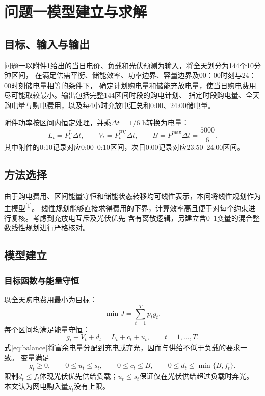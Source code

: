 \documentclass[UTF8,a4paper,12pt]{ctexart}
\begin{document}
\section{问题一模型建立与求解}

\subsection{目标、输入与输出}
问题一以附件1给出的当日电价、负载和光伏预测为输入，将全天划分为144个10分钟区间，
在满足供需平衡、储能效率、功率边界、容量边界及00：00时刻与24：00时刻储电量相等的条件下，
确定计划购电量和储能充放电量，使当日购电费用尽可能取较最小。输出包括完整144区间时段的购电计划、
指定时段购电量、全天购电量与购电费用，以及每4小时充放电汇总和0:00、24:00储电量。

附件功率按区间内恒定处理，并乘$\Delta t=1/6$ h转换为电量：
\begin{equation}
  L_t=P_t^{\mathrm L}\Delta t,\qquad
  V_t=P_t^{\mathrm{PV}}\Delta t,\qquad
  B=P^{\max}\Delta t=\frac{5000}{6}.
  \label{eq:units}
\end{equation}
其中附件的0:10记录对应0:00--0:10区间，次日0:00记录对应23:50--24:00区间。

\subsection{方法选择}
由于购电费用、区间能量守恒和储能状态转移均可线性表示，本问将线性规划作为主模型\textsuperscript{[1]}。
线性规划能够直接求得费用的下界，计算效率高且便于对每个约束进行复核。考虑到充放电互斥及光伏优先
含有离散逻辑，另建立含0--1变量的混合整数线性规划进行严格核对。

\subsection{模型建立}
\subsubsection{目标函数与能量守恒}
以全天购电费用最小为目标：
\begin{equation}
  \min J=\sum_{t=1}^{T}p_tg_t.
  \label{eq:objective}
\end{equation}
每个区间均满足能量守恒：
\begin{equation}
  g_t+V_t+d_t=L_t+c_t+u_t,\qquad t=1,\ldots,T.
  \label{eq:balance}
\end{equation}
式\eqref{eq:balance}将富余电量分配到充电或弃光，因而与供给不低于负载的要求一致。
变量满足
\begin{equation}
  g_t\ge0,\qquad 0\le u_t\le s_t,\qquad
  0\le c_t\le B,\qquad 0\le d_t\le\min\{B,f_t\}.
  \label{eq:flowbounds}
\end{equation}
限制$d_t\le f_t$体现光伏优先供给负载；$u_t\le s_t$保证仅在光伏供给超过负载时弃光。
本文认为网电购入量$g_t$没有上限。
\end{document}
